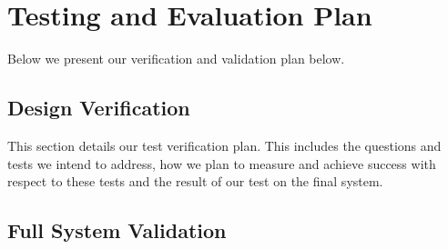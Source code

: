 
\section{Testing and Evaluation Plan}
\label{sec:te_plan}

Below we present our verification and validation plan below. 

\subsection{Design Verification}

This section details our test verification plan. This includes the questions and tests we intend to address, how we plan to measure and achieve success with respect to these tests and the result of our test on the final system.

\label{sec:verification}








\subsection{Full System Validation}
\label{sec:system_validation}
